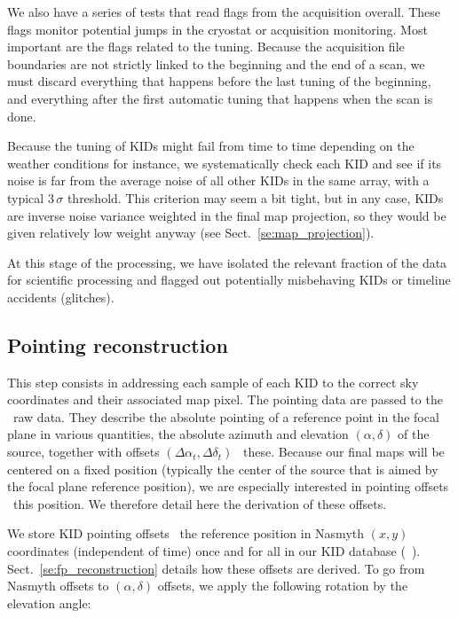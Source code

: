 We also have a series of tests that read flags from the acquisition
overall. These flags monitor potential jumps in the cryostat or acquisition
monitoring. Most important are the flags related to the tuning. Because the
acquisition file boundaries are not strictly linked to the beginning and the end of
a scan, we must discard everything that happens before the last tuning of the
beginning, and everything after the first automatic tuning that happens when the
scan is done.

Because the tuning of KIDs might fail from time to time depending on the weather
conditions for instance, we systematically check each KID and see if its noise
is far from the average noise of all other KIDs in the same array, with a
typical $3\,\sigma$ threshold. This criterion may seem a bit tight, but in any case, KIDs
are inverse noise variance weighted in the final map projection, so they would
be given relatively low weight anyway (see Sect.~\ref{se:map_projection}).

At this stage of the processing, we have isolated the relevant fraction of the
data for scientific processing and flagged out potentially misbehaving KIDs or
timeline accidents (glitches).

\subsection{Pointing reconstruction}
\label{se:ptg}

This step consists in addressing each sample of each KID to the correct sky
coordinates and their associated map pixel. The pointing data are passed to the
\nika\ raw data. They describe the absolute
pointing of a reference point in the focal plane in various quantities, the
absolute azimuth and elevation $(\alpha,\delta)$ of the source, together with
offsets $(\Delta\alpha_t, \Delta\delta_t)$ \wrt~these. Because our final maps
will be centered on a fixed position (typically the center of the source that is
aimed by the focal plane reference position), we are especially interested in
pointing offsets \wrt~this position. We therefore detail here the derivation of
these offsets.

We store KID pointing offsets \wrt\ the reference position in Nasmyth $(x,y)$
coordinates (independent of time) once and for all in our KID database
(\aka~\kidpar). Sect.~\ref{se:fp_reconstruction} details how these offsets are
derived. To go from Nasmyth offsets to $(\alpha,\delta)$ offsets, we apply the
following rotation by the elevation angle:

